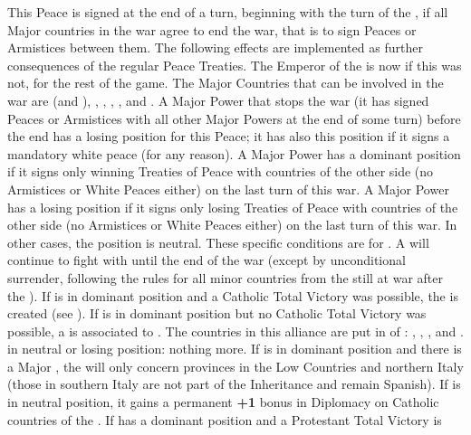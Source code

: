 \begin{digressions}
  \aparag This Peace is signed at the end of a turn, beginning with the turn
  of the , if all Major countries in the war
  agree to end the war, that is to sign Peaces or Armistices between them. The
  following effects are implemented as further consequences of the regular
  Peace Treaties.
  \aparag The Emperor of the \HRE is now \HAB if this was not, for the rest of
  the game.
  \aparag The Major Countries that can be involved in the war are \SPA (and
  \AUSmin), \AUS, \FRA, \HOL, \SUE, \ENG and \POL.
  \bparag A Major Power that stops the war (it has signed Peaces or Armistices
  with all other Major Powers at the end of some turn) before the end has a
  losing position for this Peace; it has also this position if it signs a
  mandatory white peace (for any reason).
  \bparag A Major Power has a dominant position if it signs only winning
  Treaties of Peace with countries of the other side (no Armistices or White
  Peaces either) on the last turn of this war.
  \bparag A Major Power has a losing position if it signs only losing Treaties
  of Peace with countries of the other side (no Armistices or White Peaces
  either) on the last turn of this war.
  \bparag In other cases, the position is neutral.
  \bparag These specific conditions are for \MAJHAB.
  \bparag A \AUSmin will continue to fight with \SPA until the end of the war
  (except by unconditional surrender, following the rules for all minor
  countries from the \HRE still at war after the ).
  \bparag If \HAB is in dominant position and a Catholic Total Victory was
  possible, the  is created (see ).
  \bparag If \HAB is in dominant position but no Catholic Total Victory was
  possible, a  is associated to \HAB.
  The countries in this alliance are put in \EG of \HAB: \paysBaviere,
  \paysTreves, \paysAlsace, \paysBade and \paysWurtemberg.
  \bparag \HAB in neutral or losing position: nothing more.
  \aparag[Spain] If \SPA is in dominant position and there is a Major \AUS,
  the  will only concern provinces in the Low Countries and
  northern Italy (those in southern Italy are not part of the Inheritance and
  remain Spanish).
  \aparag[Austria] If \AUS is in neutral position, it gains a permanent {\bf
    +1} bonus in Diplomacy on Catholic countries of the \HRE.
  \bparag If \HOLhol has a dominant position and a Protestant Total Victory is

\end{digressions}
